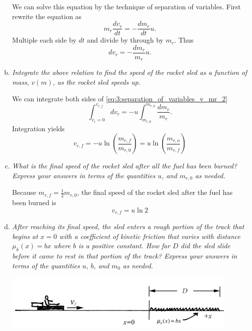 \documentclass[solutions]{esg8012exam}
\begin{document}
\begin{enumerate}[(a)]
      We can solve this equation by the technique of separation of variables.  First rewrite the equation as
      \begin{equation} m_r \frac{dv_r }{dt}=-\frac{dm_r }{dt}u. \label{eq:3:separation_of_variables_v_mr_1} \end{equation}
      Multiple each side by $dt$ and divide by through by $m_r $. Thus
      \begin{equation} dv_r =-\frac{dm_r }{m_r }u. \label{eq:3:separation_of_variables_v_mr_2} \end{equation}
    \item \emph{Integrate the above relation to find the speed of the rocket sled as a function of mass, $v(m)$, as the rocket sled speeds up.} \par
      We can integrate both sides of \autoref{eq:3:separation_of_variables_v_mr_2}
      \begin{equation} \int_{v_r =0}^{v_{r,f} } {dv_r } =-u\int_{m_{r,0} }^{m_{r,0} } {\frac{dm_r }{m_r }} . \label{eq:3:integration_vr_mr} \end{equation}
      Integration yields
      \begin{equation} v_{r,f} =-u\ln \left( {\frac{m_{r,f} }{m_{r,0} }} \right)=u\ln \left( {\frac{m_{r,o} }{m_{r,f} }} \right) \label{eq:3:vrf}\end{equation}
    \item \emph{What is the final speed of the rocket sled after all the fuel has been burned? Express your answers in terms of the quantities $u$, and $m_{r,0}$ as needed.} \par
      Because $m_{r,f} =\frac12m_{r,0}$, the final speed of the rocket sled after the fuel has been burned is
      \begin{equation} v_{r,f} =u\ln 2 \label{eq:3:vf_u} \end{equation}
    \item \emph{After reaching its final speed, the sled enters a rough portion of the track that begins at $x=0$ with a coefficient of kinetic friction that varies with distance $\mu_k (x)=bx$ where $b$ is a positive constant. How far $D$ did the sled slide before it came to rest in that portion of the track? Express your answers in terms of the quantities $u$, $b$, and $m_0$ as needed.} \par
      \begin{center}\includegraphics[width=0.9\textwidth]{exam2_s3_3}\end{center}

\end{enumerate}
\end{document}
